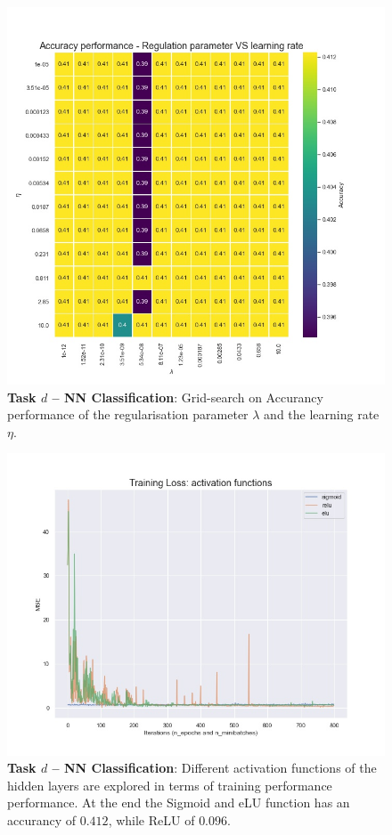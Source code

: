 \documentclass[english,notitlepage,reprint,nofootinbib]{revtex4-1}  %
\begin{document}
\begin{figure}[h]
    \centering 
    \includegraphics[scale=0.3]{Class/ClassNN_lmd_eta.jpg}
    \caption{\textbf{Task $d$ – NN Classification}: Grid-search on Accurancy performance of the regularisation parameter $\lambda$ and the learning rate $\eta$.}
    \label{fig:acc_lmd_eta}
\end{figure}

\begin{figure}[h]
    \centering 
    \includegraphics[scale=0.3]{Class/ClassNN_activations.jpg}
    \caption{\textbf{Task $d$ – NN Classification}: Different activation functions of the hidden layers are explored in terms of training performance performance. At the end the Sigmoid and eLU function has an accurancy of $0.412$, while ReLU of $0.096$.}
    \label{fig:activations_class}
\end{figure}
\end{document}
